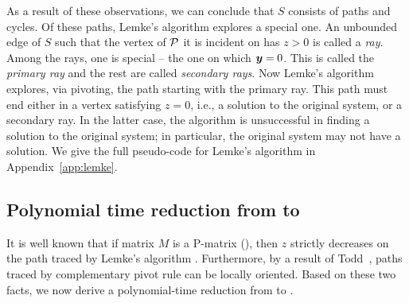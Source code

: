 As a result of these observations, we can conclude that $S$ consists of paths and cycles.  Of these paths, Lemke's algorithm
explores a special one.  An unbounded edge of $S$ such that the vertex of $\mbox{${\mathcal P}$}$ it is incident on has $z > 0$ is called a
{\em ray}.  Among the rays, one is special -- the one on which $\mbox{\boldmath $y$} = 0$. This is called the {\em primary ray} and the rest
are called {\em secondary rays}. Now Lemke's algorithm explores, via pivoting, the path starting with the primary ray. This
path must end either in a vertex satisfying $z = 0$, i.e., a solution to the original system, or a secondary ray. In the
latter case, the algorithm is unsuccessful in finding a solution to the original system; in particular, the original system
may not have a solution.  
We give the full pseudo-code for Lemke's algorithm in Appendix~\ref{app:lemke}.




\subsection{Polynomial time reduction from \PLCP to \EOPL}

It is well known that if matrix $M$ is a P-matrix (\PLCP), then $z$ strictly
decreases on the path traced by Lemke's algorithm \cite{cottle2009linear}.
Furthermore, by a result of Todd~\cite[Section 5]{todd1976orientation}, paths traced by
complementary pivot rule can be locally oriented.  Based on these two facts, 
we now derive a polynomial-time reduction from \PLCP to \EOPL.

